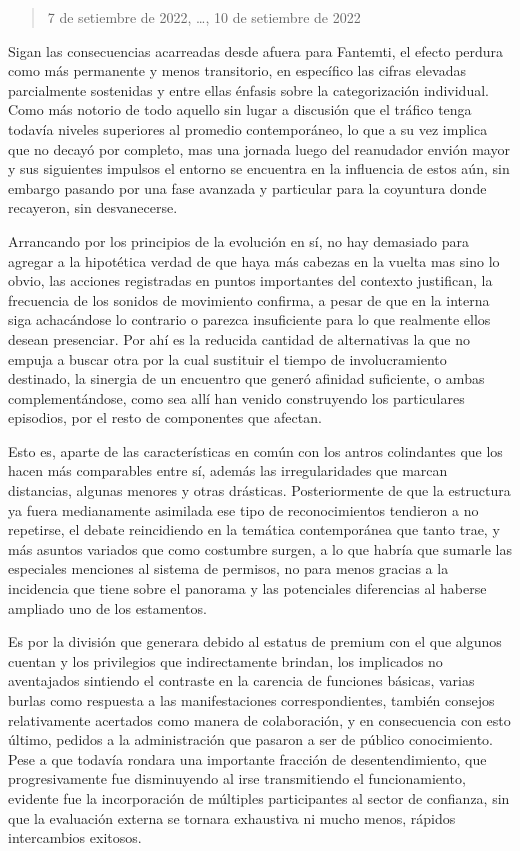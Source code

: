 \documentclass[
]{book}
\begin{document}
\begin{quote}
7 de setiembre de 2022, \ldots, 10 de setiembre de 2022
\end{quote}

Sigan las consecuencias acarreadas desde afuera para Fantemti, el efecto perdura como más permanente y menos transitorio, en específico las cifras elevadas parcialmente sostenidas y entre ellas énfasis sobre la categorización individual. Como más notorio de todo aquello sin lugar a discusión que el tráfico tenga todavía niveles superiores al promedio contemporáneo, lo que a su vez implica que no decayó por completo, mas una jornada luego del reanudador envión mayor y sus siguientes impulsos el entorno se encuentra en la influencia de estos aún, sin embargo pasando por una fase avanzada y particular para la coyuntura donde recayeron, sin desvanecerse.

Arrancando por los principios de la evolución en sí, no hay demasiado para agregar a la hipotética verdad de que haya más cabezas en la vuelta mas sino lo obvio, las acciones registradas en puntos importantes del contexto justifican, la frecuencia de los sonidos de movimiento confirma, a pesar de que en la interna siga achacándose lo contrario o parezca insuficiente para lo que realmente ellos desean presenciar. Por ahí es la reducida cantidad de alternativas la que no empuja a buscar otra por la cual sustituir el tiempo de involucramiento destinado, la sinergia de un encuentro que generó afinidad suficiente, o ambas complementándose, como sea allí han venido construyendo los particulares episodios, por el resto de componentes que afectan.

Esto es, aparte de las características en común con los antros colindantes que los hacen más comparables entre sí, además las irregularidades que marcan distancias, algunas menores y otras drásticas. Posteriormente de que la estructura ya fuera medianamente asimilada ese tipo de reconocimientos tendieron a no repetirse, el debate reincidiendo en la temática contemporánea que tanto trae, y más asuntos variados que como costumbre surgen, a lo que habría que sumarle las especiales menciones al sistema de permisos, no para menos gracias a la incidencia que tiene sobre el panorama y las potenciales diferencias al haberse ampliado uno de los estamentos.

Es por la división que generara debido al estatus de premium con el que algunos cuentan y los privilegios que indirectamente brindan, los implicados no aventajados sintiendo el contraste en la carencia de funciones básicas, varias burlas como respuesta a las manifestaciones correspondientes, también consejos relativamente acertados como manera de colaboración, y en consecuencia con esto último, pedidos a la administración que pasaron a ser de público conocimiento. Pese a que todavía rondara una importante fracción de desentendimiento, que progresivamente fue disminuyendo al irse transmitiendo el funcionamiento, evidente fue la incorporación de múltiples participantes al sector de confianza, sin que la evaluación externa se tornara exhaustiva ni mucho menos, rápidos intercambios exitosos.
\end{document}
